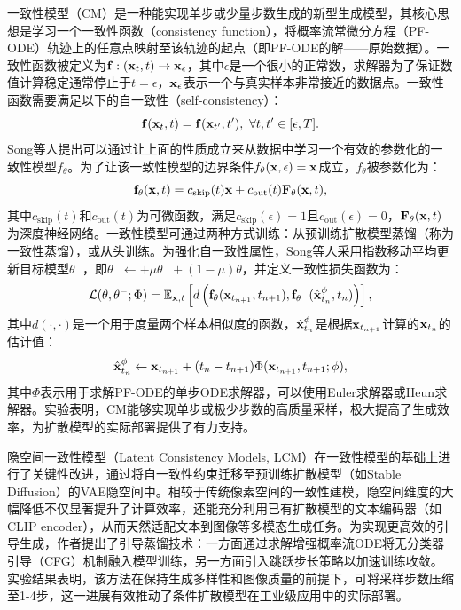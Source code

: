 \documentclass[11pt,a4paper,UTF8]{ctexart}
\begin{document}
一致性模型（CM）\cite{pmlr-v202-song23a}是一种能实现单步或少量步数生成的新型生成模型，其核心思想是学习一个一致性函数（consistency function），将概率流常微分方程（PF-ODE）轨迹上的任意点映射至该轨迹的起点（即PF-ODE的解——原始数据）。一致性函数被定义为$\mathbf{f}:(\mathbf{x}_t,t)\rightarrow \mathbf{x}_\epsilon$，其中$\epsilon$是一个很小的正常数，求解器为了保证数值计算稳定通常停止于$t=\epsilon$，$\mathbf{x}_\epsilon$表示一个与真实样本非常接近的数据点。一致性函数需要满足以下的自一致性（self-consistency）：
\begin{equation*}
    \f(\x_t,t)=\f(\x_{t^{\prime}},t^{\prime}),\ \forall t,t^\prime\in [\epsilon,T]. 
\end{equation*}
Song等人\cite{pmlr-v202-song23a}提出可以通过让上面的性质成立来从数据中学习一个有效的参数化的一致性模型$f_\theta$。为了让该一致性模型的边界条件$f_\theta(\mathbf{x},\epsilon)=\mathbf{x}$成立，$f_\theta$被参数化为：
\begin{equation*}
    \mathbf{f}_\theta(\mathbf{x},t)=c_{\text{skip}}(t)\mathbf{x} + c_{\text{out}}(t)\mathbf{F}_\theta(\mathbf{x},t),
\end{equation*}
其中$c_{\text{skip}}(t)$和$c_{\text{out}}(t)$为可微函数，满足$c_{\text{skip}}(\epsilon)=1$且$c_{\text{out}}(\epsilon)=0$，$\mathbf{F}_\theta(\mathbf{x},t)$为深度神经网络。一致性模型可通过两种方式训练：从预训练扩散模型蒸馏（称为一致性蒸馏），或从头训练。为强化自一致性属性，Song等人采用指数移动平均更新目标模型$\theta^-$，即$\theta^- \leftarrow + \mu\theta^- + (1-\mu)\theta$，并定义一致性损失函数为：
\begin{equation*}
    \mathcal{L}(\theta,\theta^-;\Phi)=\mathbb{E}_{\mathbf{x},t}\left[d\left(\mathbf{f}_\theta(\mathbf{x}_{t_{n+1}},t_{n+1}),\mathbf{f}_{\theta^-}(\hat{\mathbf{x}}_{t_n}^\phi,t_n) \right)\right],
\end{equation*}
其中$d(\cdot,\cdot)$是一个用于度量两个样本相似度的函数，$\hat{\mathbf{x}}_{t_n}^\phi$是根据$\mathbf{x}_{t_{n+1}}$计算的$\mathbf{x}_{t_{n}}$的估计值：
\begin{equation*}
    \hat{\mathbf{x}}_{t_n}^\phi \leftarrow \mathbf{x}_{t_{n+1}} + (t_n-t_{n+1})\Phi(\mathbf{x}_{t_{n+1}},t_{n+1};\phi),
\end{equation*}
其中$\Phi$表示用于求解PF-ODE的单步ODE求解器，可以使用Euler求解器\cite{song2020score}或Heun求解器\cite{karras2022elucidating}。实验表明，CM能够实现单步或极少步数的高质量采样，极大提高了生成效率，为扩散模型的实际部署提供了有力支持。

隐空间一致性模型（Latent Consistency Models, LCM）\cite{luo2023latent}在一致性模型的基础上进行了关键性改进，通过将自一致性约束迁移至预训练扩散模型（如Stable Diffusion）的VAE隐空间中。相较于传统像素空间的一致性建模，隐空间维度的大幅降低不仅显著提升了计算效率，还能充分利用已有扩散模型的文本编码器（如CLIP encoder），从而天然适配文本到图像等多模态生成任务。为实现更高效的引导生成，作者提出了引导蒸馏技术：一方面通过求解增强概率流ODE将无分类器引导（CFG）机制融入模型训练，另一方面引入跳跃步长策略以加速训练收敛。实验结果表明，该方法在保持生成多样性和图像质量的前提下，可将采样步数压缩至1-4步，这一进展有效推动了条件扩散模型在工业级应用中的实际部署。
\end{document}
